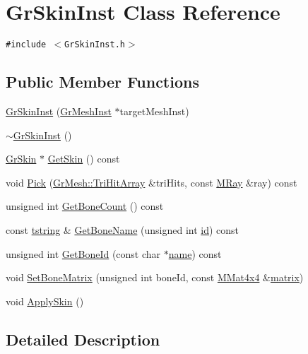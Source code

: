 \hypertarget{class_gr_skin_inst}{
\section{GrSkinInst Class Reference}
\label{class_gr_skin_inst}
}
{\tt \#include $<$GrSkinInst.h$>$}

\subsection*{Public Member Functions}
\begin{CompactItemize}
\item 
\hyperlink{class_gr_skin_inst_97aaf25b3f26c18e5ad7032d74e57f40}{GrSkinInst} (\hyperlink{class_gr_mesh_inst}{GrMeshInst} $\ast$targetMeshInst)
\item 
\hyperlink{class_gr_skin_inst_a74804ebf0e656cc67c4d4722eaf23ef}{$\sim$GrSkinInst} ()
\item 
\hyperlink{class_gr_skin}{GrSkin} $\ast$ \hyperlink{class_gr_skin_inst_d1ba05944156fe4f5a402c554e35b21b}{GetSkin} () const 
\item 
void \hyperlink{class_gr_skin_inst_d4d83abff901eccff4500f217c6af8a9}{Pick} (\hyperlink{class_u_fast_array}{GrMesh::TriHitArray} \&triHits, const \hyperlink{class_m_ray}{MRay} \&ray) const 
\item 
unsigned int \hyperlink{class_gr_skin_inst_cf78011014e52a7f8b14fe00a83b7151}{GetBoneCount} () const 
\item 
const \hyperlink{common__afx_8h_816fa58fd77499b0edb2c69ebe803d5c}{tstring} \& \hyperlink{class_gr_skin_inst_1fce790a944bbf468dacc975b7b020c8}{GetBoneName} (unsigned int \hyperlink{glext__bak_8h_58c2a664503e14ffb8f21012aabff3e9}{id}) const 
\item 
unsigned int \hyperlink{class_gr_skin_inst_a2fc77f57e5873e8967452d9c4359d43}{GetBoneId} (const char $\ast$\hyperlink{glext__bak_8h_bb62efe59ccdd153ce42e1a418352209}{name}) const 
\item 
void \hyperlink{class_gr_skin_inst_c87444515796dea8b8e939cc43434655}{SetBoneMatrix} (unsigned int boneId, const \hyperlink{class_m_mat4x4}{MMat4x4} \&\hyperlink{glext__bak_8h_7b24a3f2f56eb1244ae69dacb4fecb6f}{matrix})
\item 
void \hyperlink{class_gr_skin_inst_26a87eb455330a647709378ca51f3d52}{ApplySkin} ()
\end{CompactItemize}


\subsection{Detailed Description}


